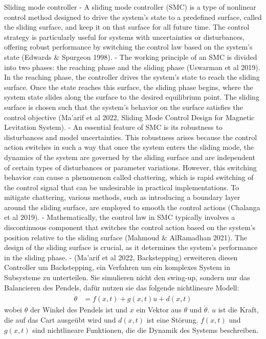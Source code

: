 Sliding mode controller
- A sliding mode controller (SMC) is a type of nonlinear control method designed to drive the system's state to a predefined surface, called the sliding surface, and keep it on that surface for all future time. The control strategy is particularly useful for systems with uncertainties or disturbances, offering robust performance by switching the control law based on the system's state (Edwards & Spurgeon 1998).
- The working principle of an SMC is divided into two phases: the reaching phase and the sliding phase (Uswarman et al 2019). In the reaching phase, the controller drives the system's state to reach the sliding surface. Once the state reaches this surface, the sliding phase begins, where the system state slides along the surface to the desired equilibrium point. The sliding surface is chosen such that the system's behavior on the surface satisfies the control objective (Ma'arif et al 2022, Sliding Mode Control Design for Magnetic Levitation System).
- An essential feature of SMC is its robustness to disturbances and model uncertainties. This robustness arises because the control action switches in such a way that once the system enters the sliding mode, the dynamics of the system are governed by the sliding surface and are independent of certain types of disturbances or parameter variations. However, this switching behavior can cause a phenomenon called chattering, which is rapid switching of the control signal that can be undesirable in practical implementations. To mitigate chattering, various methods, such as introducing a boundary layer around the sliding surface, are employed to smooth the control actions (Chalanga et al 2019).
- Mathematically, the control law in SMC typically involves a discontinuous component that switches the control action based on the system's position relative to the sliding surface (Mahmoud & AlRamadhan 2021). The design of the sliding surface is crucial, as it determines the system's performance in the sliding phase.
- (Ma'arif et al 2022, Backstepping) erweiteren diesen Controller um Backstepping, ein Verfahren um ein komplexes System in Subsysteme zu unterteilen. Sie simulieren nicht den swing-up, sondern nur das Balancieren des Pendels, dafür nutzen sie das folgende nichtlineare Modell:
\begin{align}
    \dot{\theta} &= f(x,t) + g(x,t)u + d(x,t)
\end{align}
wobei $\theta$ der Winkel des Pendels ist und $x$ ein Vektor aus $\theta$ und $\dot{\theta}$. $u$ ist die Kraft, die auf das Cart ausgeübt wird und $d(x,t)$ ist eine Störung. $f(x,t)$ und $g(x,t)$ sind nichtlineare Funktionen, die die Dynamik des Systems beschreiben.
